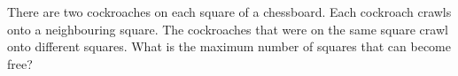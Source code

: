 There are two cockroaches on each square of a chessboard.
Each cockroach crawls onto a neighbouring square.
The cockroaches that were on the same square crawl onto different squares.
What is the maximum number of squares that can become free?